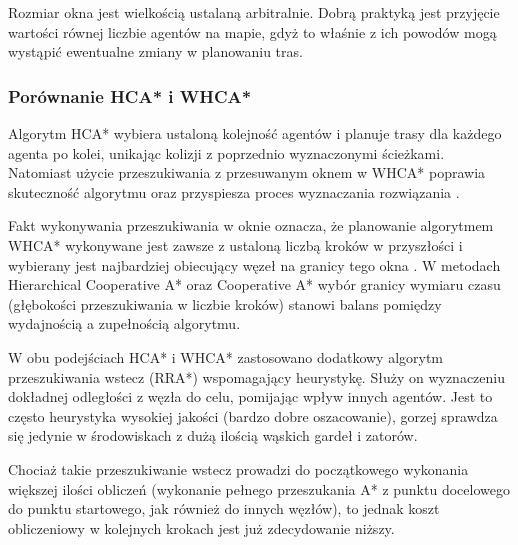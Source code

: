 Rozmiar okna jest wielkością ustalaną arbitralnie. Dobrą praktyką jest przyjęcie wartości równej liczbie agentów na mapie, gdyż to właśnie z ich powodów mogą wystąpić ewentualne zmiany w planowaniu tras.

\subsubsection{Porównanie HCA* i WHCA*}
Algorytm HCA* wybiera ustaloną kolejność agentów i planuje trasy dla każdego agenta po kolei, unikając kolizji z poprzednio wyznaczonymi ścieżkami. 
Natomiast użycie przeszukiwania z przesuwanym oknem w WHCA* poprawia skuteczność algorytmu oraz przyspiesza proces wyznaczania rozwiązania \cite{completealgo_standley}.

Fakt wykonywania przeszukiwania w oknie oznacza, że planowanie algorytmem WHCA* wykonywane jest zawsze z ustaloną liczbą kroków w przyszłości i wybierany jest najbardziej obiecujący węzeł na granicy tego okna \cite{rtcooppathfinding}. W metodach Hierarchical Cooperative A* oraz Cooperative A* wybór granicy wymiaru czasu (głębokości przeszukiwania w liczbie kroków) stanowi balans pomiędzy wydajnością a zupełnością algorytmu.

W obu podejściach HCA* i WHCA* zastosowano dodatkowy algorytm przeszukiwania wstecz (RRA*) wspomagający heurystykę. Służy on wyznaczeniu dokładnej odległości z węzła do celu, pomijając wpływ innych agentów. Jest to często heurystyka wysokiej jakości (bardzo dobre oszacowanie), gorzej sprawdza się jedynie w środowiskach z dużą ilością wąskich gardeł i zatorów. \cite{rtcooppathfinding}

Chociaż takie przeszukiwanie wstecz prowadzi do początkowego wykonania większej ilości obliczeń (wykonanie pełnego przeszukania A* z punktu docelowego do punktu startowego, jak również do innych węzłów), to jednak koszt obliczeniowy w kolejnych krokach jest już zdecydowanie niższy. \cite{rtcooppathfinding}
